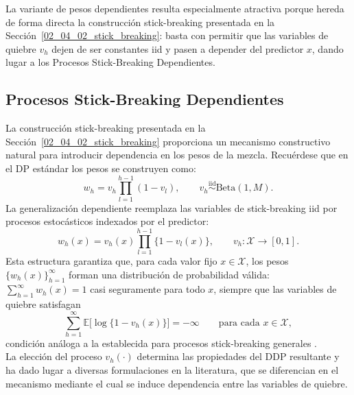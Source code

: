 La variante de pesos dependientes resulta especialmente atractiva porque hereda de forma directa la construcción stick-breaking presentada en la Sección~\ref{02_04_02_stick_breaking}: basta con permitir que las variables de quiebre $v_h$ dejen de ser constantes iid y pasen a depender del predictor $x$, dando lugar a los Procesos Stick-Breaking Dependientes.

\subsection{Procesos Stick-Breaking Dependientes}
\label{02_06_02_sb_dependiente}
La construcción stick-breaking presentada en la Sección~\ref{02_04_02_stick_breaking} proporciona un mecanismo constructivo natural para introducir dependencia en los pesos de la mezcla. Recuérdese que en el DP estándar los pesos se construyen como:
\begin{equation}
    w_h = v_h \prod_{l=1}^{h-1}(1 - v_l),
    \qquad v_h \overset{\mathrm{iid}}{\sim} \mathrm{Beta}(1, M).
\end{equation}
La generalización dependiente reemplaza las variables de stick-breaking iid por procesos estocásticos indexados por el predictor:
\begin{equation}\label{eq:ddp_sb_general}
    w_h(x) = v_h(x) \prod_{l=1}^{h-1}\bigl\{1 - v_l(x)\bigr\},
    \qquad v_h : \mathcal{X} \to [0,1].
\end{equation}
Esta estructura garantiza que, para cada valor fijo $x \in \mathcal{X}$, los pesos $\{w_h(x)\}_{h=1}^{\infty}$ forman una distribución de probabilidad válida: $\sum_{h=1}^{\infty} w_h(x) = 1$ casi seguramente para todo $x$, siempre que las variables de quiebre satisfagan
\begin{equation}\label{eq:ddp_sb_condicion}
    \sum_{h=1}^{\infty} \mathbb{E}\bigl[\log\{1 - v_h(x)\}\bigr] = -\infty
    \qquad \text{para cada } x \in \mathcal{X},
\end{equation}
condición análoga a la establecida para procesos stick-breaking generales \cite{03_02_chung2009nonparametric}.\\

La elección del proceso $v_h(\cdot)$ determina las propiedades del DDP resultante y ha dado lugar a diversas formulaciones en la literatura, que se diferencian en el mecanismo mediante el cual se induce dependencia entre las variables de quiebre. \\

